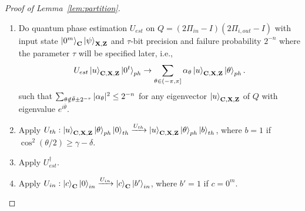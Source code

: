 \begin{proof}[Proof of Lemma~\ref{lem:partition}]
\begin{algorithm}[h]
    \begin{mdframed}[style=figstyle,innerleftmargin=10pt,innerrightmargin=10pt]
    \begin{enumerate}
    \item Do quantum phase estimation $U_{est}$ on $Q=(2\Pi_{in}-I)(2\Pi_{i,out}-I)$ with input state $\ket{0^m}_{\mathbf{C}}\ket{\psi}_{\mathbf{X},\mathbf{Z}}$ and $\tau$-bit precision and failure probability $2^{-n}$ where the parameter $\tau$ will be specified later, i.e.,  
    \begin{align*}
        U_{est}\ket{u}_{\mathbf{C},\mathbf{X},\mathbf{Z}}\ket{0^t}_{ph} \rightarrow \sum_{\theta\in(-\pi,\pi]} \alpha_{\theta} \ket{u}_{\mathbf{C},\mathbf{X},\mathbf{Z}}\ket{\theta}_{ph}.
    \end{align*}
 such that $\sum_{\theta\notin \bar{\theta}\pm 2^{-\tau}}|\alpha_{\theta}|^2\leq 2^{-n}$ for any eigenvector $\ket{u}_{\mathbf{C},\mathbf{X},\mathbf{Z}}$ of $Q$ with eigenvalue $e^{i\bar{\theta}}$.
    \item Apply $U_{th}:\ket{u}_{\mathbf{C},\mathbf{X},\mathbf{Z}}\ket{\theta}_{ph}\ket{0}_{th} \xrightarrow{U_{th}} \ket{u}_{\mathbf{C},\mathbf{X},\mathbf{Z}}\ket{\theta}_{ph}\ket{b}_{th} $, 
    where $b=1$ if $\cos^2 (\theta/2)\geq \gamma-\delta$.
    \item Apply $U_{est}^\dag$. 
   \item Apply $U_{in}: \ket{c}_{\mathbf{C}}\ket{0}_{in} \xrightarrow{U_{in}}  \ket{c}_{\mathbf{C}}\ket{b'}_{in}$,
    where $b'=1$ if $c= 0^m$. 
\end{enumerate}
    \caption{$G_{i,\gamma}$}
    \label{fig:process_G}
    \end{mdframed}
\end{algorithm}


\end{proof}
